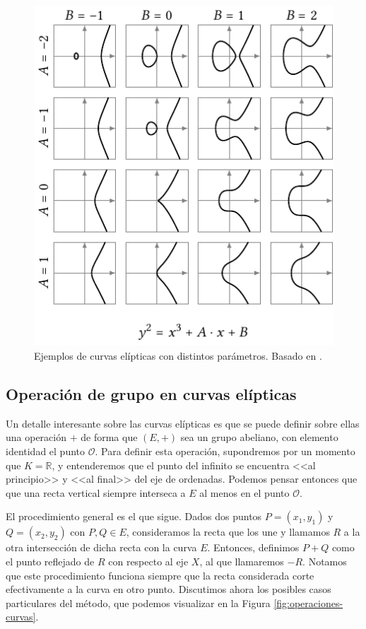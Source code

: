 \documentclass[
  a4paper,
  12pt,
  spanish,
]{scrartcl}
\begin{document}
\begin{figure}[h]
  \centering
  \includegraphics[width=.75\textwidth]{img/parametros-curvas}
  \caption{Ejemplos de curvas elípticas con distintos parámetros. Basado en  \parencite{eichlseder_elliptic_2016}.}
  \label{fig:parametros}
\end{figure}

\subsection{Operación de grupo en curvas elípticas}

Un detalle interesante sobre las curvas elípticas es que se puede definir sobre ellas una operación $+$ de forma que $(E, +)$ sea un grupo abeliano, con elemento identidad el punto $\mathcal{O}$. Para definir esta operación, supondremos por un momento que $K = \mathbb{R}$, y entenderemos que el punto del infinito se encuentra <<al principio>> y <<al final>> del eje de ordenadas. 
Podemos pensar entonces que que una recta vertical siempre interseca a $E$ al menos en el punto \(\mathcal{O}\).

El procedimiento general es el que sigue. Dados dos puntos $P = (x_1, y_1)$ y $Q = (x_2, y_2)$ con $P,Q \in E$, consideramos la recta que los une y llamamos $R$ a la otra intersección de dicha recta con la curva $E$. Entonces, definimos $P + Q$ como el punto reflejado de $R$ con respecto al eje $X$, al que llamaremos $-R$. Notamos que este procedimiento funciona siempre que la recta considerada corte efectivamente a la curva en otro punto. Discutimos ahora los posibles casos particulares del método, que podemos visualizar en la Figura \ref{fig:operaciones-curvas}.
    
\end{document}
